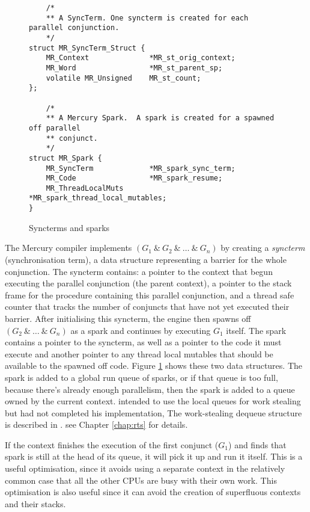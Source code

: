 \begin{figure}
\begin{verbatim}
    /*
    ** A SyncTerm. One syncterm is created for each parallel conjunction.
    */
struct MR_SyncTerm_Struct {
    MR_Context              *MR_st_orig_context;
    MR_Word                 *MR_st_parent_sp;
    volatile MR_Unsigned    MR_st_count;
};

    /*
    ** A Mercury Spark.  A spark is created for a spawned off parallel
    ** conjunct.
    */
struct MR_Spark {
    MR_SyncTerm             *MR_spark_sync_term;
    MR_Code                 *MR_spark_resume;
    MR_ThreadLocalMuts      *MR_spark_thread_local_mutables;
}
\end{verbatim}
\caption{Syncterms and sparks}
\label{fig:spark_and_syncterm}
\end{figure}

The Mercury compiler implements $(G_1~\&~G_2~\&~\ldots~\&~G_n)$
by creating a \emph{syncterm} (synchronisation term), a data structure
representing a barrier for the whole conjunction.
The syncterm contains:
a pointer to the context that begun executing the parallel conjunction
(the parent context),
a pointer to the stack frame for the procedure containing this parallel
conjunction,
and a thread safe counter that tracks the number of conjuncts that have not
yet executed their barrier.
After initialising this syncterm, the engine then
spawns off $(G_2~\&~\ldots~\&~G_n)$ as a spark and continues by executing
$G_1$ itself.
The spark contains a pointer to the syncterm,
as well as a pointer to the code it must execute
and another pointer to any thread local mutables that should be available to the
spawned off code.
Figure \ref{fig:spark_and_syncterm} shows these two data structures.
The spark is added to a global run queue of sparks, or if that queue is too
full, because there's already enough parallelism,
then the spark is added to a queue owned by the current context.
\citet{wang_hons_thesis} intended to use the local queues for work stealing
but had not completed his implementation,
The work-stealing dequeue structure
is described in \citet{Chase_2005_wsdeque}.
see Chapter \ref{chap:rts} for details.

If the context finishes the execution of the first conjunct ($G_1$)
and finds that spark is still at the head of its queue,
it will pick it up and run it itself.
This is a useful optimisation,
since it avoids using a separate context in the relatively common case
that all the other CPUs are busy with their own work.
This optimisation is also useful since it can avoid the creation of superfluous
contexts and their stacks.

